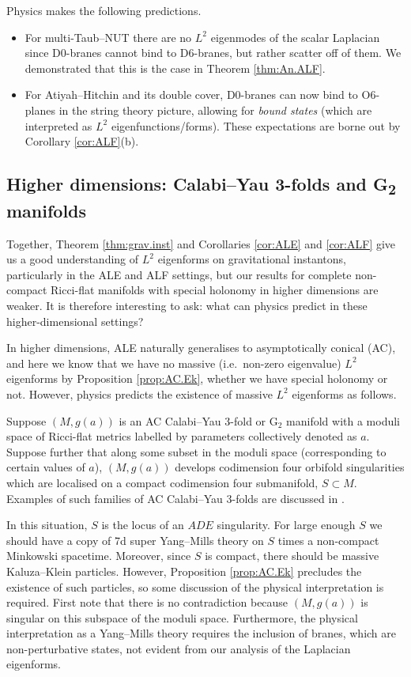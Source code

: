\documentclass{article}
\theoremstyle{definition}
\numberwithin{thm}{section}
\numberwithin{equation}{section}
\begin{document}
Physics makes the following predictions.
\begin{itemize}
\item For multi-Taub--NUT there are no $L^2$ eigenmodes of the scalar Laplacian since D0-branes cannot bind to D6-branes, but rather scatter off of them. We demonstrated that this is the case in Theorem \ref{thm:An.ALF}. 
\item For Atiyah--Hitchin and its double cover,  
D0-branes can now bind to O6-planes in the string theory picture, allowing for \emph{bound states} (which are interpreted as $L^2$ eigenfunctions/forms).  These expectations are borne out by Corollary \ref{cor:ALF}(b).
\end{itemize}

\subsection{Higher dimensions: Calabi--Yau 3-folds and \texorpdfstring{G\textsubscript{2}}{G2} manifolds}
 
Together, Theorem \ref{thm:grav.inst} and Corollaries \ref{cor:ALE} and \ref{cor:ALF} give us a good understanding of $L^2$ eigenforms on gravitational instantons, particularly in the ALE and ALF settings, but our results for complete non-compact Ricci-flat manifolds with special holonomy in higher dimensions are weaker.  
It is therefore interesting to ask: what can physics predict in these higher-dimensional settings?  

In higher dimensions, ALE naturally generalises to asymptotically conical (AC), and here we know that we have no massive (i.e.~non-zero eigenvalue) $L^2$ eigenforms  by Proposition \ref{prop:AC.Ek}, whether we have special holonomy or not.  However, physics predicts the existence of massive $L^2$ eigenforms as follows. 

 
Suppose $(M, g(a))$ is an AC Calabi--Yau 3-fold or $\text{G}_2$ manifold  with a moduli space of Ricci-flat metrics labelled by parameters collectively denoted as $a$. Suppose further that along some subset in the moduli space (corresponding to certain values of $a$), $(M, g(a))$ develops codimension four  orbifold singularities which are localised on a compact codimension four submanifold, $S \subset M$.  Examples of such families of AC Calabi--Yau 3-folds are discussed in \cite{Acharya2}.  

In this situation, $S$ is the locus of an $ADE$ singularity.  For large enough $S$ we should have a copy of 7d super Yang--Mills theory on $S$ times a non-compact Minkowski spacetime.  Moreover, since $S$ is compact, there should be massive Kaluza--Klein particles.  However, Proposition \ref{prop:AC.Ek} precludes the existence of such particles, so some discussion of the physical interpretation is required. First note that there is no contradiction because $(M, g(a))$ is singular on this subspace of the moduli space. Furthermore, the physical interpretation as a Yang--Mills theory requires the inclusion of branes, which are non-perturbative states, not evident from our analysis of the Laplacian eigenforms. 
\end{document}
